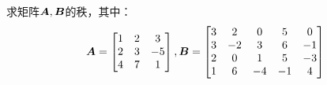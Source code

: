 \begin{problem}\label{problem-1.25}
求矩阵\(\boldsymbol{A},\boldsymbol{B}\)的秩，其中：
\begin{equation*}
    \boldsymbol{A}=
    \begin{bmatrix}
        1 & 2 & 3  \\
        2 & 3 & -5 \\
        4 & 7 & 1
    \end{bmatrix},
    \boldsymbol{B}=
    \begin{bmatrix}
        3 & 2  & 0  & 5  & 0  \\
        3 & -2 & 3  & 6  & -1 \\
        2 & 0  & 1  & 5  & -3 \\
        1 & 6  & -4 & -1 & 4
    \end{bmatrix}
\end{equation*}
\end{problem}
